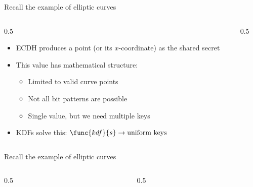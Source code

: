 \ifdefined\PRESENTATION\else\PassOptionsToClass{handout}{beamer}\fi\documentclass[aspectratio=169, lualatex]{beamer}
\begin{document}
\begin{frame}{Recall the example of elliptic curves}
	\begin{columns}[c]
		\begin{column}{0.5\textwidth}
			\begin{itemize}
				\item ECDH produces a point (or its $x$-coordinate) as the shared secret
				\item This value has mathematical structure:
				      \begin{itemize}
					      \item Limited to valid curve points
					      \item Not all bit patterns are possible
					      \item Single value, but we need multiple keys
				      \end{itemize}
				\item KDFs solve this: $\func{kdf}{s} \rightarrow \text{uniform keys}$
			\end{itemize}
		\end{column}
		\begin{column}{0.5\textwidth}
		\end{column}
	\end{columns}
\end{frame}

\begin{frame}{Recall the example of elliptic curves}
	\begin{columns}[c]
		\begin{column}{0.5\textwidth}
			\begin{center}
			\end{center}
		\end{column}
		\begin{column}{0.5\textwidth}
		\end{column}
	\end{columns}
\end{frame}
\end{document}
